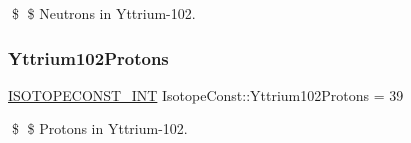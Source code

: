 \$ \$ Neutrons in Yttrium-\/102. \mbox{\label{group___isotope_const-_yttrium-_y102_gaf4e5fccf02b40a6f17620ee513ca7b3a}} 
\subsubsection{\texorpdfstring{Yttrium102\+Protons}{Yttrium102Protons}}
{\footnotesize\ttfamily \mbox{\hyperlink{group___isotope_const-_macros_ga5f18360b3e99483a35c32d789e62621c}{I\+S\+O\+T\+O\+P\+E\+C\+O\+N\+S\+T\+\_\+\+I\+NT}} Isotope\+Const\+::\+Yttrium102\+Protons = 39}

\$ \$ Protons in Yttrium-\/102. 